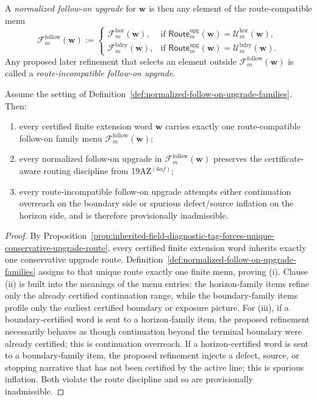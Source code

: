 \begin{definition}
A \emph{normalized follow-on upgrade} for \(\mathbf w\) is then any element of the route-compatible menu
\[
 \mathcal F^{\mathrm{follow}}_{m}(\mathbf w)
 :=
 \begin{cases}
 \mathcal F^{\mathrm{hor}}_{m}(\mathbf w), & \text{if }\mathsf{Route}^{\mathrm{upg}}_{m}(\mathbf w)=\mathcal U^{\mathrm{hor}}_{m}(\mathbf w),\\[2mm]
 \mathcal F^{\mathrm{bdry}}_{m}(\mathbf w), & \text{if }\mathsf{Route}^{\mathrm{upg}}_{m}(\mathbf w)=\mathcal U^{\mathrm{bdry}}_{m}(\mathbf w).
 \end{cases}
\]
Any proposed later refinement that selects an element outside \(\mathcal F^{\mathrm{follow}}_{m}(\mathbf w)\) is called a \emph{route-incompatible follow-on upgrade}.
\end{definition}

\begin{proposition}
\label{prop:every-certified-word-carries-a-finite-route-compatible-follow-on-upgrade-menu}
Assume the setting of Definition~\ref{def:normalized-follow-on-upgrade-families}. Then:
\begin{enumerate}[label=(\roman*)]
 \item every certified finite extension word \(\mathbf w\) carries exactly one route-compatible follow-on family menu \(\mathcal F^{\mathrm{follow}}_{m}(\mathbf w)\);
 \item every normalized follow-on upgrade in \(\mathcal F^{\mathrm{follow}}_{m}(\mathbf w)\) preserves the certificate-aware routing discipline from 19AZ$^{(6af)}$;
 \item every route-incompatible follow-on upgrade attempts either continuation overreach on the boundary side or spurious defect/source inflation on the horizon side, and is therefore provisionally inadmissible.
\end{enumerate}
\end{proposition}

\begin{proof}
By Proposition~\ref{prop:inherited-field-diagnostic-tag-forces-unique-conservative-upgrade-route}, every certified finite extension word inherits exactly one conservative upgrade route. Definition~\ref{def:normalized-follow-on-upgrade-families} assigns to that unique route exactly one finite menu, proving (i). Clause (ii) is built into the meanings of the menu entries: the horizon-family items refine only the already certified continuation range, while the boundary-family items profile only the earliest certified boundary or exposure picture. For (iii), if a boundary-certified word is sent to a horizon-family item, the proposed refinement necessarily behaves as though continuation beyond the terminal boundary were already certified; this is continuation overreach. If a horizon-certified word is sent to a boundary-family item, the proposed refinement injects a defect, source, or stopping narrative that has not been certified by the active line; this is spurious inflation. Both violate the route discipline and so are provisionally inadmissible.
\end{proof}

